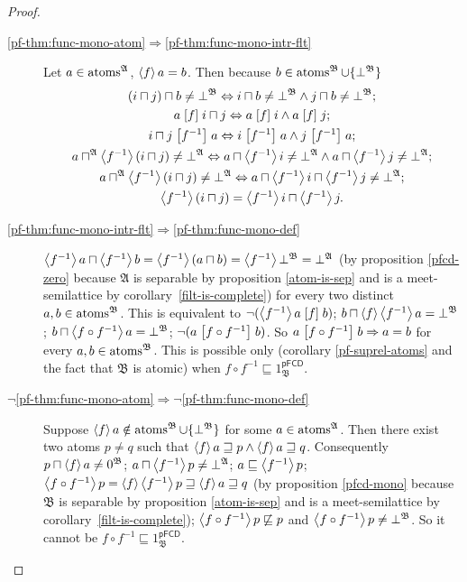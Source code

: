 \begin{proof}
~
\begin{description}
\item [{\ref{pf-thm:func-mono-atom}$\Rightarrow$\ref{pf-thm:func-mono-intr-flt}}] Let
$a\in\operatorname{atoms}^{\mathfrak{A}}$, $\left\langle f\right\rangle a=b$. Then because $b\in\operatorname{atoms}^{\mathfrak{B}}\cup\{\bot^{\mathfrak{B}}\}$
\begin{gather*}
(i\sqcap j)\sqcap b\ne\bot^{\mathfrak{B}}\Leftrightarrow i\sqcap b\ne\bot^{\mathfrak{B}}\land j\sqcap b\ne\bot^{\mathfrak{B}};\\
a\mathrel{\left[f\right]}i\sqcap j\Leftrightarrow a\mathrel{\left[f\right]}i\land a\mathrel{\left[f\right]}j;\\
i\sqcap j\mathrel{\left[f^{-1}\right]}a\Leftrightarrow i\mathrel{\left[f^{-1}\right]}a\land j\mathrel{\left[f^{-1}\right]}a;\\
a\sqcap^{\mathfrak{A}}\left\langle f^{-1}\right\rangle(i\sqcap j)\ne\bot^{\mathfrak{A}}\Leftrightarrow a\sqcap\left\langle f^{-1}\right\rangle i\ne\bot^{\mathfrak{A}}\land a\sqcap\left\langle f^{-1}\right\rangle j\ne\bot^{\mathfrak{A}};\\
a\sqcap^{\mathfrak{A}}\left\langle f^{-1}\right\rangle(i\sqcap j)\ne\bot^{\mathfrak{A}}\Leftrightarrow a\sqcap\left\langle f^{-1}\right\rangle i\sqcap\left\langle f^{-1}\right\rangle j\ne\bot^{\mathfrak{A}};\\
\left\langle f^{-1}\right\rangle(i\sqcap j)=\left\langle f^{-1}\right\rangle i\sqcap\left\langle f^{-1}\right\rangle j.
\end{gather*}

\item [{\ref{pf-thm:func-mono-intr-flt}$\Rightarrow$\ref{pf-thm:func-mono-def}}] $\left\langle f^{-1}\right\rangle a\sqcap\left\langle f^{-1}\right\rangle b=\left\langle f^{-1}\right\rangle(a\sqcap b)=\left\langle f^{-1}\right\rangle\bot^{\mathfrak{B}}=\bot^{\mathfrak{A}}$
(by proposition \ref{pfcd-zero} because $\mathfrak{A}$ is separable
by proposition \ref{atom-is-sep} and is a meet-semilattice by corollary~\ref{filt-is-complete})
for every two distinct $a,b\in\operatorname{atoms}^{\mathfrak{B}}$. This is equivalent
to $\lnot(\left\langle f^{-1}\right\rangle a\mathrel{\left[f\right]}b)$; $b\sqcap\left\langle f\right\rangle\left\langle f^{-1}\right\rangle a=\bot^{\mathfrak{B}}$;
$b\sqcap\left\langle f\circ f^{-1}\right\rangle a=\bot^{\mathfrak{B}}$; $\lnot(a\mathrel{\left[f\circ f^{-1}\right]}b)$.
So $a\mathrel{\left[f\circ f^{-1}\right]}b\Rightarrow a=b$ for every $a,b\in\operatorname{atoms}^{\mathfrak{B}}$.
This is possible only (corollary \ref{pf-suprel-atoms} and the fact
that $\mathfrak{B}$ is atomic) when $f\circ f^{-1}\sqsubseteq1_{\mathfrak{B}}^{\mathsf{pFCD}}$.
\item [{$\neg$\ref{pf-thm:func-mono-atom}$\Rightarrow\neg$\ref{pf-thm:func-mono-def}}] Suppose
$\left\langle f\right\rangle a\notin\operatorname{atoms}^{\mathfrak{B}}\cup\{\bot^{\mathfrak{B}}\}$
for some $a\in\operatorname{atoms}^{\mathfrak{A}}$. Then there exist two atoms
$p\neq q$ such that $\left\langle f\right\rangle a\sqsupseteq p\wedge\left\langle f\right\rangle a\sqsupseteq q$.
Consequently $p\sqcap\left\langle f\right\rangle a\neq0^{\mathfrak{B}}$; $a\sqcap\left\langle f^{-1}\right\rangle p\ne\bot^{\mathfrak{A}}$;
$a\sqsubseteq\left\langle f^{-1}\right\rangle p$; $\left\langle f\circ f^{-1}\right\rangle p=\left\langle f\right\rangle\left\langle f^{-1}\right\rangle p\sqsupseteq\left\langle f\right\rangle a\sqsupseteq q$
(by proposition \ref{pfcd-mono} because $\mathfrak{B}$ is separable
by proposition \ref{atom-is-sep} and is a meet-semilattice by corollary~\ref{filt-is-complete});
$\left\langle f\circ f^{-1}\right\rangle p\not\sqsubseteq p$ and $\left\langle f\circ f^{-1}\right\rangle p\ne\bot^{\mathfrak{B}}$.
So it cannot be $f\circ f^{-1}\sqsubseteq1_{\mathfrak{B}}^{\mathsf{pFCD}}$.
\end{description}
\end{proof}

